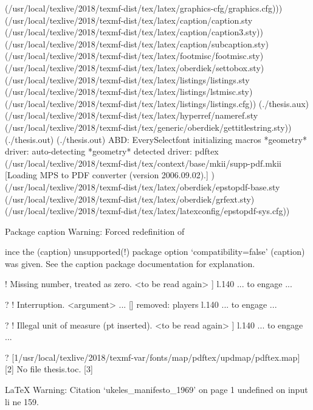 (/usr/local/texlive/2018/texmf-dist/tex/latex/graphics-cfg/graphics.cfg)))
(/usr/local/texlive/2018/texmf-dist/tex/latex/caption/caption.sty
(/usr/local/texlive/2018/texmf-dist/tex/latex/caption/caption3.sty))
(/usr/local/texlive/2018/texmf-dist/tex/latex/caption/subcaption.sty)
(/usr/local/texlive/2018/texmf-dist/tex/latex/footmisc/footmisc.sty)
(/usr/local/texlive/2018/texmf-dist/tex/latex/oberdiek/settobox.sty)
(/usr/local/texlive/2018/texmf-dist/tex/latex/listings/listings.sty
(/usr/local/texlive/2018/texmf-dist/tex/latex/listings/lstmisc.sty)
(/usr/local/texlive/2018/texmf-dist/tex/latex/listings/listings.cfg))
(./thesis.aux)
(/usr/local/texlive/2018/texmf-dist/tex/latex/hyperref/nameref.sty
(/usr/local/texlive/2018/texmf-dist/tex/generic/oberdiek/gettitlestring.sty))
(./thesis.out) (./thesis.out) ABD: EverySelectfont initializing macros
*geometry* driver: auto-detecting
*geometry* detected driver: pdftex
(/usr/local/texlive/2018/texmf-dist/tex/context/base/mkii/supp-pdf.mkii
[Loading MPS to PDF converter (version 2006.09.02).]
) (/usr/local/texlive/2018/texmf-dist/tex/latex/oberdiek/epstopdf-base.sty
(/usr/local/texlive/2018/texmf-dist/tex/latex/oberdiek/grfext.sty)
(/usr/local/texlive/2018/texmf-dist/tex/latex/latexconfig/epstopdf-sys.cfg))

Package caption Warning: Forced redefinition of \caption since the
(caption)                unsupported(!) package option `compatibility=false'
(caption)                was given.
See the caption package documentation for explanation.

! Missing number, treated as zero.
<to be read again> 
                   ]
l.140 ... to engage \DIFdelbegin {}
                                                  \DIFdelend \DIFaddbegin \D...

? ! Interruption.
<argument> ... [\@tufte@sidenote@vertical@offset ]
                                                  {removed: players }
l.140 ... to engage \DIFdelbegin {}
                                                  \DIFdelend \DIFaddbegin \D...

? ! Illegal unit of measure (pt inserted).
<to be read again> 
                   ]
l.140 ... to engage \DIFdelbegin {}
                                                  \DIFdelend \DIFaddbegin \D...

? [1{/usr/local/texlive/2018/texmf-var/fonts/map/pdftex/updmap/pdftex.map}]
[2]
No file thesis.toc.
[3]

LaTeX Warning: Citation `ukeles_manifesto_1969' on page 1 undefined on input li
ne 159.


